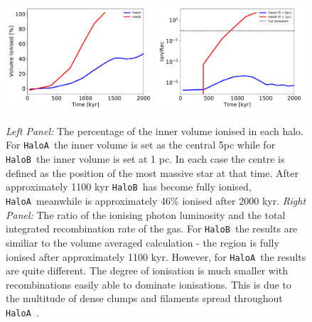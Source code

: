 \documentclass[graphics, twocolumn, usenatbib]{mn2e}
\newcommand{\ha} {\texttt{HaloA~}}
\newcommand{\hb} {\texttt{HaloB~}}
\begin{document}
\begin{figure}
\centering
\begin{minipage}{175mm}      \begin{center} 
\centerline{
\includegraphics[width=0.49\textwidth]{FIGURES/Ionisation.pdf}
\includegraphics[width=0.49\textwidth]{FIGURES/Recombination.pdf}}
\caption{\textit{Left Panel:} The percentage of the inner volume ionised in each halo. For \ha the
    inner volume is set as the central 5pc while for \hb the inner volume is set at 1 pc. In each case
    the centre is defined as the position of the most massive star at that time. After approximately
    1100 kyr \hb has become fully ionised, \ha meanwhile is approximately 46\% ionised after 2000
    kyr. \textit{Right Panel:} The ratio of the ionising photon luminosity and the total integrated
    recombination rate of the gas. For \hb the results are similiar to the volume averaged
    calculation - the region is fully ionised after approximately 1100 kyr. However, for \ha the
    results are quite different. The degree of ionisation is much smaller with recombinations easily
    able to dominate ionisations. This is due to the multitude of dense clumps and filaments
    spread throughout \ha. 
  }  \label{Fig:Ionisation}
\end{center} \end{minipage}

\end{figure}
\end{document}
